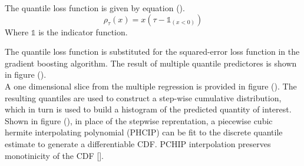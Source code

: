 The quantile loss function is given by equation ().
\begin{equation}
\rho_\tau(x) = x(\tau - \mathbb{1}_{(x < 0)})
\end{equation}
Where $\mathbb{1}$ is the indicator function.

The quantile loss function is substituted for the squared-error loss function in the gradient boosting algorithm.  The result of multiple quantile predictores is shown in figure (). \\

A one dimensional slice from the multiple regression is provided in figure ().
The resulting quantiles are used to construct a step-wise cumulative distribution, which in turn is used to build a histogram of the predicted quantity of interest. \\

Shown in figure (), in place of the stepwise reprentation, a piecewise cubic hermite interpolating polynomial (PHCIP) can be fit to the discrete quantile estimate to generate a differentiable CDF.
PCHIP interpolation preserves monotinicity of the CDF [].
